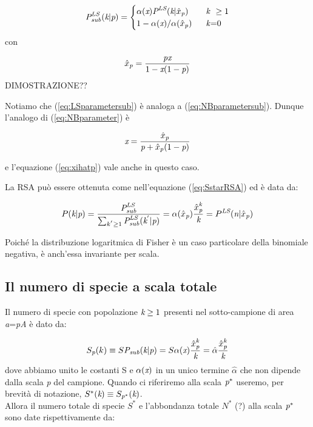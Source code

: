 \begin{equation}
\emph{P}^\emph{LS}_\emph{sub}(\emph{k}|\emph{p})=\begin{cases} \alpha(\emph{x}) \emph{P}^\emph{LS}(\emph{k}|\emph{$ \hat x$}_\emph{p}) & \mbox{ }\mbox{ \emph{k} } \ge 1 \\ 1-\alpha(\emph{x})/\alpha(\emph{$\hat x$}_\emph{p}) & \mbox{ } \mbox{ \emph{k}=0}
\end{cases}
\end{equation}
con



\begin{equation}
\emph{$\hat x$}_\emph{p}=\frac{\emph{px}}{1-\emph{x}(1-\emph{p})}
\label{eq:LSparametersub}
\end{equation}
DIMOSTRAZIONE??

Notiamo che (\ref{eq:LSparametersub}) è analoga a (\ref{eq:NBparametersub}). Dunque l'analogo di (\ref{eq:NBparameter}) è


\begin{equation}
\emph{x}=\frac{\emph{$\hat x$}_\emph{p}}{\emph{p}+\emph{$\hat x$}_\emph{p}(1-\emph{p})}
\label{eq:LSparameter}
\end{equation}

e l'equazione (\ref{eq:xihatp}) vale anche in questo caso.


La RSA può essere ottenuta come nell'equazione (\ref{eq:SstarRSA}) ed è data da:

\begin{equation}
P(\emph{k}|\emph{p})=\frac{\emph{P}^\emph{LS}_\emph{sub}}{\sum_{k^{'} \ge 1}^{} \emph{P}^\emph{LS}_\emph{sub}(\emph{k}^{'}|\emph{p})}=\alpha(\emph{$\hat x$}_\emph{p}) \frac{\emph{$\hat x$}^\emph{k}_\emph{p}}{\emph{k}}=P^\emph{LS}(\emph{n}| \emph{$\hat x$}_\emph{p})
\end{equation}

Poiché la distribuzione logaritmica di Fisher è un caso particolare della binomiale negativa, è anch'essa invariante per scala.


\subsection{Il numero di specie a scala totale}
Il numero di specie con popolazione $\emph{k} \ge 1$ presenti nel sotto-campione di area \emph{a}=\emph{pA} è dato da:

\begin{equation}
S_\emph{p}(k) \equiv S\emph{P}_\emph{sub}(\emph{k}|\emph{p})=S\alpha(\emph{x})\frac{\emph{$\hat x$}^\emph{k}_\emph{p}}{\emph{k}}=\hat \alpha \frac{\emph{$\hat x$}^\emph{k}_\emph{p}}{\emph{k}}
\end{equation} 
dove abbiamo unito le costanti S e $\alpha (\emph{x})$ in un unico termine $\hat \alpha$ che non dipende dalla scala \emph{p} del campione. Quando ci riferiremo alla scala $\emph{p}^*$ useremo, per brevità di notazione, $S^*(\emph{k})\equiv S_{\emph{p}^*}(\emph{k})$.\\
Allora il numero totale di specie $S^*$ e l'abbondanza totale $N^*$ (?) alla scala $\emph{p}^*$ sono date rispettivamente da:


